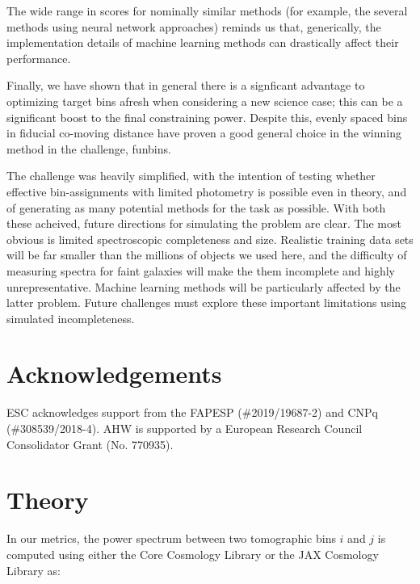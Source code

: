 \documentclass[twocolumn,twocolappendix]{aastex63}
\begin{document}
The wide range in scores for nominally similar methods (for example, the several methods using
neural network approaches) reminds us that, generically, the implementation details of machine
learning methods can drastically affect their performance.

Finally, we have shown that in general there is a signficant advantage to optimizing
target bins afresh when considering a new science case; this can be a significant boost
to the final constraining power.
Despite this, evenly spaced bins in fiducial co-moving distance have proven
a good general choice in the winning method in the challenge, {\sc funbins}.

The challenge was heavily simplified, with the intention of testing whether
effective bin-assignments with limited photometry is possible even in theory,
and of generating as many potential methods for the task as possible.  With
both these acheived, future directions for simulating the problem are clear.
The most obvious is limited spectroscopic completeness and size.  Realistic
training data sets will be far smaller than the millions of objects we used here,
and the difficulty of measuring spectra for faint galaxies will make the them
incomplete and highly unrepresentative. Machine learning methods will be particularly
affected by the latter problem.  Future challenges must explore these important limitations
using simulated incompleteness.


\section{Acknowledgements}
ESC acknowledges support from the FAPESP (\#2019/19687-2) and CNPq  (\#308539/2018-4).
AHW is supported by a European Research Council Consolidator Grant (No. 770935).




\appendix

\section{Theory}\label{app:theory}

In our metrics, the power spectrum between two tomographic bins $i$ and $j$ is
computed using either the Core Cosmology Library \citep{ccl} or the JAX
Cosmology Library \citep{jax-cosmo} as:
\end{document}
